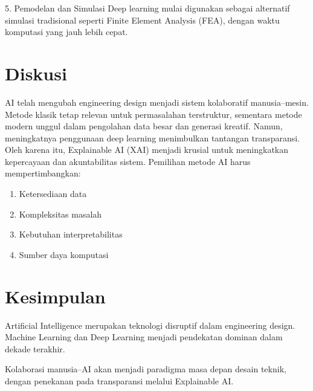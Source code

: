 \documentclass{article}
\begin{document}
5. Pemodelan dan Simulasi
Deep learning mulai digunakan sebagai alternatif simulasi tradisional seperti Finite Element Analysis (FEA), dengan waktu komputasi yang jauh lebih cepat.

\section*{Diskusi}
AI telah mengubah engineering design menjadi sistem kolaboratif manusia–mesin. Metode klasik tetap relevan untuk permasalahan terstruktur, sementara metode modern unggul dalam pengolahan data besar dan generasi kreatif. \cite{boden2004machine}
Namun, meningkatnya penggunaan deep learning menimbulkan tantangan transparansi. Oleh karena itu, Explainable AI (XAI) menjadi krusial untuk meningkatkan kepercayaan dan akuntabilitas sistem.
Pemilihan metode AI harus mempertimbangkan: \cite{Brynjolfsson2017wireless} \begin{enumerate}
\item Ketersediaan data
\item Kompleksitas masalah
\item Kebutuhan interpretabilitas
\item Sumber daya komputasi
\end{enumerate}

\section*{Kesimpulan}

Artificial Intelligence merupakan teknologi disruptif dalam engineering design. Machine Learning dan Deep Learning menjadi pendekatan dominan dalam dekade terakhir.

Kolaborasi manusia–AI akan menjadi paradigma masa depan desain teknik, dengan penekanan pada transparansi melalui Explainable AI.




\end{document}

